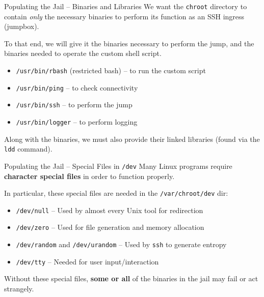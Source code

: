 \documentclass[14pt,compress,dvipsnames,aspectratio=169]{beamer} %
\begin{document}
\begin{frame}{Populating the Jail -- Binaries and Libraries}
    We want the \texttt{chroot} directory to contain \textit{only} the necessary
    binaries to perform its function as an SSH ingress (jumpbox).  

    To that end, we will give it the binaries necessary to perform the jump, and the
    binaries needed to operate the custom shell script.  
    \begin{itemize}
        \item{\texttt{/usr/bin/rbash} (restricted bash) -- to run the custom script} 
        \item{\texttt{/usr/bin/ping} -- to check connectivity} 
        \item{\texttt{/usr/bin/ssh} -- to perform the jump} 
        \item{\texttt{/usr/bin/logger} -- to perform logging} 
    \end{itemize}
    Along with the binaries, we must also provide their linked libraries (found via
    the \texttt{ldd} command).  
\end{frame}


\begin{frame}{Populating the Jail -- Special Files in \texttt{/dev}}
    Many Linux programs require \textbf{character special files} in order to function
    properly.

    In particular, these special files are needed in the \texttt{/var/chroot/dev} dir:
    \begin{itemize}
        \item{\texttt{/dev/null} -- Used by almost every Unix tool for redirection} 
        \item{\texttt{/dev/zero} -- Used for file generation and memory allocation} 
        \item{\texttt{/dev/random} and \texttt{/dev/urandom} -- Used by \texttt{ssh} to generate entropy } 
        \item{\texttt{/dev/tty} -- Needed for user input/interaction} 
    \end{itemize}
    \vspace{0.5em}
    Without these special files, \textbf{some or all} of the binaries in the jail may
    fail or act strangely.
\end{frame}
\end{document}

